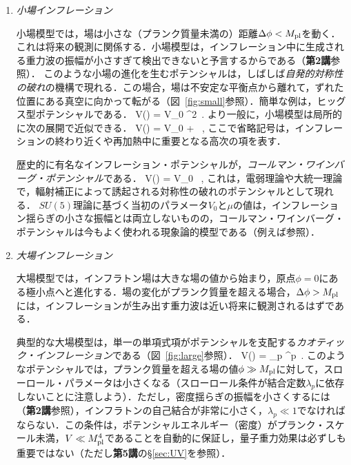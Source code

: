 \begin{enumerate}
\item {\it 小場インフレーション}

小場模型では，場は小さな（プランク質量未満の）距離$\Delta \phi < M_{\rm pl}$を動く．
これは将来の観測に関係する．小場模型は，インフレーション中に生成される重力波の振幅が小さすぎて検出できないと予言するからである（{\bf 第2講}参照）．
このような小場の進化を生むポテンシャルは，しばしば{\it 自発的対称性の破れ}の機構で現れる．この場合，場は不安定な平衡点から離れて，ずれた位置にある真空に向かって転がる（図~\ref{fig:small}参照）．簡単な例は，ヒッグス型ポテンシャルである．
\beq
V(\phi) = V_0 ^2\, .
\eeq
より一般に，小場模型は局所的に次の展開で近似できる．
\beq
V(\phi) = V_0  + \cdots \ ,
\eeq
ここで省略記号は，インフレーションの終わり近くや再加熱中に重要となる高次の項を表す．

歴史的に有名なインフレーション・ポテンシャルが，{\it コールマン・ワインバーグ・ポテンシャル}である\cite{Linde:1981mu, Albrecht:1982wi}．
\beq
V(\phi) = V_0 \, ,
\eeq
これは，電弱理論や大統一理論で，輻射補正によって誘起される対称性の破れのポテンシャルとして現れる．
$SU(5)$理論に基づく当初のパラメータ$V_0$と$\mu$の値は，インフレーション揺らぎの小さな振幅とは両立しないものの，コールマン・ワインバーグ・ポテンシャルは今もよく使われる現象論的模型である（例えば\cite{Shafi:2006cs}参照）．

\item {\it 大場インフレーション}

大場模型では，インフラトン場は大きな場の値から始まり，原点$\phi=0$にある極小点へと進化する．場の変化がプランク質量を超える場合，$\Delta \phi > M_{\rm pl}$には，インフレーションが生み出す重力波は近い将来に観測されるはずである．

典型的な大場模型は，単一の単項式項がポテンシャルを支配する{\it カオティック・インフレーション}である（図~\ref{fig:large}参照）．
\beq
V(\phi) = \lambda_p \phi^p\, .
\eeq
このようなポテンシャルでは，プランク質量を超える場の値$\phi \gg M_{\rm pl}$に対して，スローロール・パラメータは小さくなる（スローロール条件が結合定数$\lambda_p$に依存しないことに注意しよう）．ただし，密度揺らぎの振幅を小さくするには（{\bf 第2講}参照），インフラトンの自己結合が非常に小さく，$\lambda_p \ll 1$でなければならない．この条件は，ポテンシャルエネルギー（密度）がプランク・スケール未満，$V \ll M_{\rm pl}^4$であることを自動的に保証し，量子重力効果は必ずしも重要ではない（ただし{\bf 第5講}の\S\ref{sec:UV}を参照）．


\end{enumerate}
